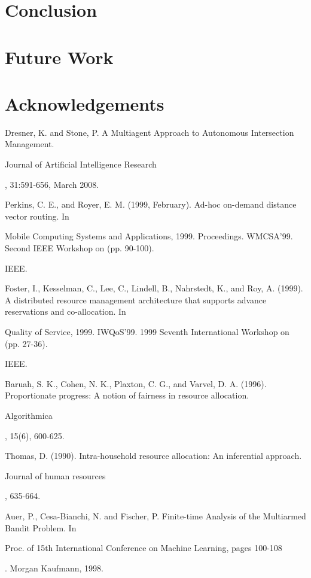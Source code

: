 \documentclass[conference]{IEEEtran}
\begin{document}
\section{Conclusion}


\section{Future Work}


\section{Acknowledgements}

\begin{thebibliography}{1}
Dresner, K. and Stone, P. A Multiagent Approach to Autonomous Intersection Management. \begin{em}Journal of Artificial Intelligence Research\end{em}, 31:591-656, March 2008.

Perkins, C. E., and Royer, E. M. (1999, February). Ad-hoc on-demand distance vector routing. In \begin{em}Mobile Computing Systems and Applications, 1999. Proceedings. WMCSA'99. Second IEEE Workshop on (pp. 90-100).\end{em} IEEE.

Foster, I., Kesselman, C., Lee, C., Lindell, B., Nahrstedt, K., and Roy, A. (1999). A distributed resource management architecture that supports advance reservations and co-allocation. In \begin{em}Quality of Service, 1999. IWQoS'99. 1999 Seventh International Workshop on (pp. 27-36).\end{em} IEEE.

Baruah, S. K., Cohen, N. K., Plaxton, C. G., and Varvel, D. A. (1996). Proportionate progress: A notion of fairness in resource allocation. \begin{em}Algorithmica\end{em}, 15(6), 600-625.

Thomas, D. (1990). Intra-household resource allocation: An inferential approach. \begin{em}Journal of human resources\end{em}, 635-664.

Auer, P., Cesa-Bianchi, N. and Fischer, P. Finite-time Analysis of the Multiarmed Bandit Problem. In \begin{em} Proc. of 15th International Conference on Machine Learning, pages 100-108\end{em}. Morgan Kaufmann, 1998.

\end{thebibliography}




\end{document}
